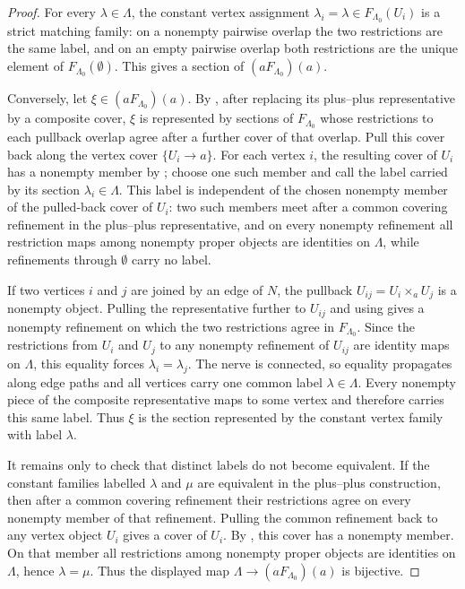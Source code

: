 \begin{proof}
For every \(\lambda\in\Lambda\), the constant vertex assignment
\(\lambda_i=\lambda\in F_{\Lambda_0}(U_i)\) is a strict matching family:
on a nonempty pairwise overlap the two restrictions are the same label,
and on an empty pairwise overlap both restrictions are the unique element
of \(F_{\Lambda_0}(\emptyset)\). This gives a section of
\((aF_{\Lambda_0})(a)\).

Conversely, let \(\xi\in(aF_{\Lambda_0})(a)\). By
, after replacing its
plus--plus representative by a composite cover, \(\xi\) is represented by
sections of \(F_{\Lambda_0}\) whose restrictions to each pullback overlap
agree after a further cover of that overlap. Pull this cover back along
the vertex cover \(\{U_i\to a\}\). For each vertex \(i\), the resulting
cover of \(U_i\) has a nonempty member by
; choose one such member and
call the label carried by its section \(\lambda_i\in\Lambda\). This label
is independent of the chosen nonempty member of the pulled-back cover of
\(U_i\): two such members meet after a common covering refinement in the
plus--plus representative, and on every nonempty refinement all
restriction maps among nonempty proper objects are identities on
\(\Lambda\), while refinements through \(\emptyset\) carry no label.

If two vertices \(i\) and \(j\) are joined by an edge of \(N\), the
pullback \(U_{ij}=U_i\times_aU_j\) is a nonempty object. Pulling the
representative further to \(U_{ij}\) and using
 gives a nonempty refinement on
which the two restrictions agree in \(F_{\Lambda_0}\). Since the
restrictions from \(U_i\) and \(U_j\) to any nonempty refinement of
\(U_{ij}\) are identity maps on \(\Lambda\), this equality forces
\(\lambda_i=\lambda_j\). The nerve is connected, so equality propagates
along edge paths and all vertices carry one common label
\(\lambda\in\Lambda\). Every nonempty piece of the composite
representative maps to some vertex and therefore carries this same label.
Thus \(\xi\) is the section represented by the constant vertex family with
label \(\lambda\).

It remains only to check that distinct labels do not become equivalent.
If the constant families labelled \(\lambda\) and \(\mu\) are equivalent
in the plus--plus construction, then after a common covering refinement
their restrictions agree on every nonempty member of that refinement.
Pulling the common refinement back to any vertex object \(U_i\) gives a
cover of \(U_i\). By , this
cover has a nonempty member. On that member all restrictions among
nonempty proper objects are identities on \(\Lambda\), hence
\(\lambda=\mu\). Thus the displayed map
\(\Lambda\to(aF_{\Lambda_0})(a)\) is bijective.
\end{proof}


